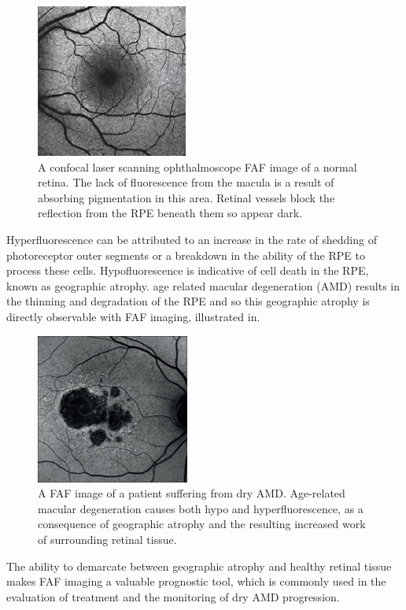 \begin{figure}[htbp]
\centering
 \includegraphics{figures/faf}
\caption{A confocal laser scanning ophthalmoscope FAF image of a normal retina. The lack of fluorescence from the macula is a result of absorbing pigmentation in this area. Retinal vessels block the reflection from the RPE beneath them so appear dark.}
\label{fig:faf}
    \end{figure}

Hyperfluorescence can be attributed to an increase in the rate
of shedding of photoreceptor outer segments or a breakdown in
the ability of the RPE to process these cells. Hypofluorescence
is indicative of cell death in the RPE, known as geographic atrophy.
age related macular degeneration (AMD) results in the thinning and
degradation of the RPE and so this geographic atrophy is directly
observable with FAF imaging, illustrated in.

\begin{figure}[htbp]
\centering
 \includegraphics{figures/fafamd}
\caption{A FAF image of a patient suffering from dry AMD. Age-related macular degeneration causes both hypo and hyperfluorescence, as a consequence of geographic atrophy and the resulting increased work of surrounding retinal tissue.\cite{2_audo_2015}}
\label{fig:fafamd}
    \end{figure}

The ability to demarcate between geographic atrophy and healthy retinal tissue makes FAF imaging a valuable prognostic tool, which is commonly used in the evaluation of treatment and the monitoring of dry AMD progression.\cite{1_murphy_2015}

